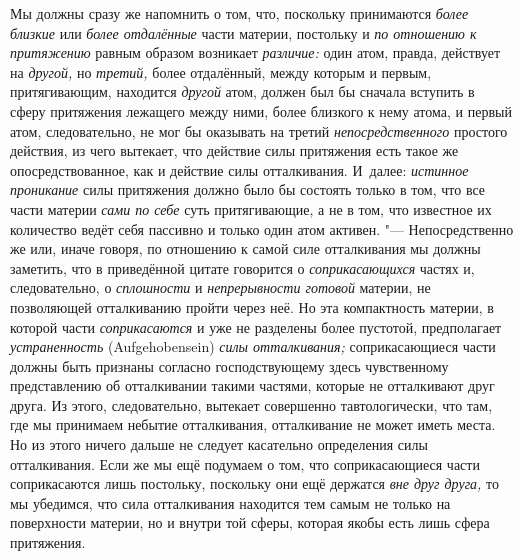 Мы должны сразу же напомнить о том, что, поскольку принимаются
{\em более близкие} или {\em более
отдалённые} части материи, постольку и {\em по
отношению к притяжению} равным образом возникает
{\em различие:} один атом, правда, действует на {\em другой,} но {\em третий,}
более отдалённый, между которым и первым, притягивающим, находится
{\em другой} атом, должен был бы сначала вступить в
сферу притяжения лежащего между ними, более близкого к нему атома, и первый
атом, следовательно, не мог бы оказывать на третий
{\em непосредственного} простого действия, из чего
вытекает, что действие силы притяжения есть такое же опосредствованное, как
и действие силы отталкивания. И~далее: {\em истинное
проникание} силы притяжения должно было бы состоять только в том, что все
части материи {\em сами по себе} суть притягивающие, а
не в том, что известное их количество ведёт себя пассивно и только один
атом активен. "--- Непосредственно же или, иначе говоря, по отношению к самой
силе отталкивания мы должны заметить, что в приведённой цитате говорится о
{\em соприкасающихся} частях и, следовательно, о
{\em сплошности} и
{\em непрерывности готовой} материи, не позволяющей
отталкиванию пройти через неё. Но эта компактность материи, в которой части
{\em соприкасаются} и уже не разделены более пустотой,
предполагает {\em устраненность} (Auf\-ge\-ho\-ben\-sein)
{\em силы отталкивания;} соприкасающиеся части должны
быть признаны согласно господствующему здесь чувственному представлению об
отталкивании такими частями, которые не отталкивают друг друга. Из этого,
следовательно, вытекает совершенно тавтологически, что там, где мы
принимаем небытие отталкивания, отталкивание не может иметь места. Но из
этого ничего дальше не следует касательно определения силы отталкивания.
Если же мы ещё подумаем о том, что соприкасающиеся части соприкасаются лишь
постольку, поскольку они ещё держатся {\em вне друг
друга,} то мы убедимся, что сила отталкивания находится тем самым не только
на поверхности материи, но и внутри той сферы, которая якобы есть лишь
сфера притяжения.

